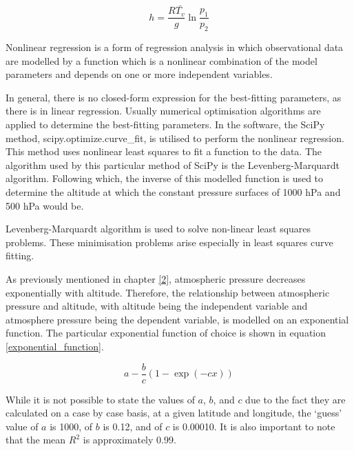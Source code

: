 \begin{equation}
    \label{hypsometric}
    h = \frac{R \bar{T_v}}{g} \ln{\frac{p_1}{p_2}}
\end{equation}

\begin{definition}
Nonlinear regression is a form of regression analysis in which observational data are modelled by a function which is a nonlinear combination of the model parameters and depends on one or more independent variables.
\end{definition}

In general, there is no closed-form expression for the best-fitting parameters, as there is in linear regression. Usually numerical optimisation algorithms are applied to determine the best-fitting parameters\cite{nonlingress_def}. In the software, the SciPy method, scipy.optimize.curve\_fit, is utilised to perform the nonlinear regression. This method uses nonlinear least squares to fit a function to the data. The algorithm used by this particular method of SciPy is the Levenberg-Marquardt algorithm\cite{scipy_nonlingress}. Following which, the inverse of this modelled function is used to determine the altitude at which the constant pressure surfaces of 1000 hPa and 500 hPa would be.

\begin{definition}
Levenberg-Marquardt algorithm is used to solve non-linear least squares problems. These minimisation problems arise especially in least squares curve fitting.
\end{definition}

As previously mentioned in chapter \ref{2}, atmospheric pressure decreases exponentially with altitude. Therefore, the relationship between atmospheric pressure and altitude, with altitude being the independent variable and atmosphere pressure being the dependent variable, is modelled on an exponential function. The particular exponential function of choice is shown in equation \ref{exponential_function}.

\begin{equation}
    \label{exponential_function}
    a - \frac{b}{c} (1 - \exp(-c x))
\end{equation}

While it is not possible to state the values of $a$, $b$, and $c$ due to the fact they are calculated on a case by case basis, at a given latitude and longitude, the `guess' value of $a$ is 1000, of $b$ is 0.12, and of $c$ is 0.00010. It is also important to note that the mean $R^2$ is approximately 0.99.

